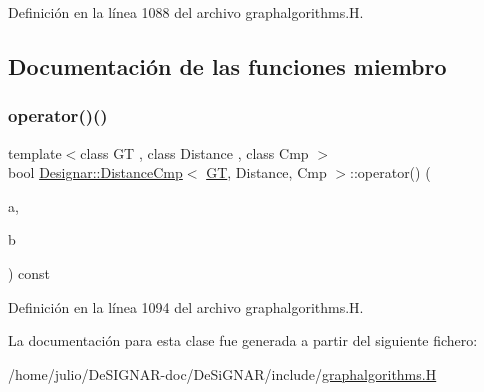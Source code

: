 Definición en la línea 1088 del archivo graphalgorithms.\+H.



\subsection{Documentación de las funciones miembro}
\mbox{\label{class_designar_1_1_distance_cmp_a5de92b27c64e3493d950a99018d28671}} 
\subsubsection{\texorpdfstring{operator()()}{operator()()}}
{\footnotesize\ttfamily template$<$class GT , class Distance , class Cmp $>$ \\
bool \hyperlink{class_designar_1_1_distance_cmp}{Designar\+::\+Distance\+Cmp}$<$ \hyperlink{demo-buildgraph_8_c_a3001c40d2c31ca87ed96cd7d1334a55e}{GT}, Distance, Cmp $>$\+::operator() (\begin{DoxyParamCaption}\item[{typename G\+T\+::\+Arc \&}]{a,  }\item[{typename G\+T\+::\+Arc \&}]{b }\end{DoxyParamCaption}) const\hspace{0.3cm}{\ttfamily [inline]}}



Definición en la línea 1094 del archivo graphalgorithms.\+H.



La documentación para esta clase fue generada a partir del siguiente fichero\+:\begin{DoxyCompactItemize}
\item 
/home/julio/\+De\+S\+I\+G\+N\+A\+R-\/doc/\+De\+Si\+G\+N\+A\+R/include/\hyperlink{graphalgorithms_8_h}{graphalgorithms.\+H}\end{DoxyCompactItemize}
